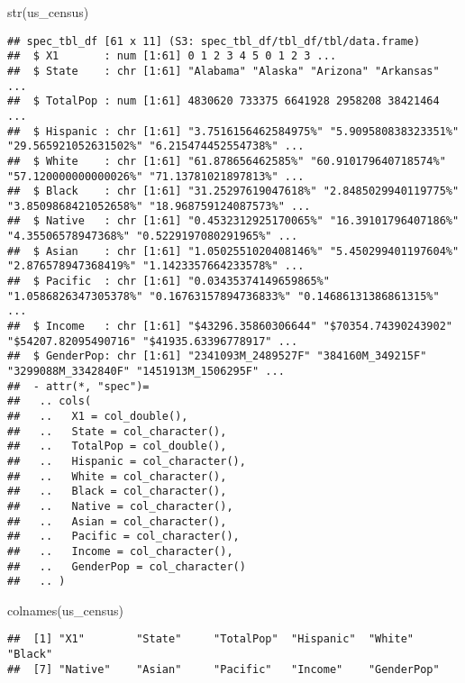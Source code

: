 \documentclass[
]{article}
\newenvironment{Shaded}{\begin{snugshade}}{\end{snugshade}}
\newcommand{\FunctionTok}[1]{\textcolor[rgb]{0.00,0.00,0.00}{#1}}
\newcommand{\NormalTok}[1]{#1}
\begin{document}
\begin{Shaded}
\begin{Highlighting}[]
\FunctionTok{str}\NormalTok{(us\_census)}
\end{Highlighting}
\end{Shaded}

\begin{verbatim}
## spec_tbl_df [61 x 11] (S3: spec_tbl_df/tbl_df/tbl/data.frame)
##  $ X1       : num [1:61] 0 1 2 3 4 5 0 1 2 3 ...
##  $ State    : chr [1:61] "Alabama" "Alaska" "Arizona" "Arkansas" ...
##  $ TotalPop : num [1:61] 4830620 733375 6641928 2958208 38421464 ...
##  $ Hispanic : chr [1:61] "3.7516156462584975%" "5.909580838323351%" "29.565921052631502%" "6.215474452554738%" ...
##  $ White    : chr [1:61] "61.878656462585%" "60.910179640718574%" "57.120000000000026%" "71.13781021897813%" ...
##  $ Black    : chr [1:61] "31.25297619047618%" "2.8485029940119775%" "3.8509868421052658%" "18.968759124087573%" ...
##  $ Native   : chr [1:61] "0.4532312925170065%" "16.39101796407186%" "4.35506578947368%" "0.5229197080291965%" ...
##  $ Asian    : chr [1:61] "1.0502551020408146%" "5.450299401197604%" "2.876578947368419%" "1.1423357664233578%" ...
##  $ Pacific  : chr [1:61] "0.03435374149659865%" "1.0586826347305378%" "0.16763157894736833%" "0.14686131386861315%" ...
##  $ Income   : chr [1:61] "$43296.35860306644" "$70354.74390243902" "$54207.82095490716" "$41935.63396778917" ...
##  $ GenderPop: chr [1:61] "2341093M_2489527F" "384160M_349215F" "3299088M_3342840F" "1451913M_1506295F" ...
##  - attr(*, "spec")=
##   .. cols(
##   ..   X1 = col_double(),
##   ..   State = col_character(),
##   ..   TotalPop = col_double(),
##   ..   Hispanic = col_character(),
##   ..   White = col_character(),
##   ..   Black = col_character(),
##   ..   Native = col_character(),
##   ..   Asian = col_character(),
##   ..   Pacific = col_character(),
##   ..   Income = col_character(),
##   ..   GenderPop = col_character()
##   .. )
\end{verbatim}

\begin{Shaded}
\begin{Highlighting}[]
\FunctionTok{colnames}\NormalTok{(us\_census)}
\end{Highlighting}
\end{Shaded}

\begin{verbatim}
##  [1] "X1"        "State"     "TotalPop"  "Hispanic"  "White"     "Black"    
##  [7] "Native"    "Asian"     "Pacific"   "Income"    "GenderPop"
\end{verbatim}
\end{document}
